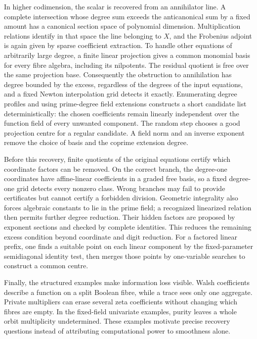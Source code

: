 In higher codimension, the scalar is recovered from an annihilator line.
A complete intersection whose degree sum exceeds the anticanonical sum by
a fixed amount has a canonical section space of polynomial dimension.
Multiplication relations identify in that space the line belonging to $X$,
and the Frobenius adjoint is again given by sparse coefficient extraction.
To handle other equations of arbitrarily large degree, a finite linear
projection gives a common monomial basis for every fibre algebra, including
its nilpotents. The residual quotient is free over the same projection
base. Consequently the obstruction to annihilation has degree bounded by
the excess, regardless of the degrees of the input equations, and a fixed
Newton interpolation grid detects it exactly. Enumerating degree
profiles and using prime-degree field extensions constructs a short
candidate list deterministically: the chosen coefficients remain linearly
independent over the function field of every unwanted component. The
random step chooses a good projection centre for a regular candidate.
A field norm and an inverse exponent remove the choice of basis and the
coprime extension degree.

Before this recovery, finite quotients of the original equations certify which coordinate factors can be removed. On the correct branch, the degree-one coordinates have affine-linear coefficients in a graded free basis, so a fixed degree-one grid detects every nonzero class. Wrong branches may fail to provide certificates but cannot certify a forbidden division. Geometric integrality also forces algebraic constants to lie in the prime field; a recognized linearized relation then permits further degree reduction. Their hidden factors are proposed by exponent sections and checked by complete identities. This reduces the remaining excess condition beyond coordinate and digit reduction. For a factored linear prefix, one finds a suitable point on each linear component by the fixed-parameter semidiagonal identity test, then merges those points by one-variable searches to construct a common centre.

Finally, the structured examples make information loss visible. Walsh coefficients describe a function on a split Boolean fibre, while a trace sees only one aggregate. Private multipliers can erase several zeta coefficients without changing which fibres are empty. In the fixed-field univariate examples, purity leaves a whole orbit multiplicity undetermined. These examples motivate precise recovery questions instead of attributing computational power to smoothness alone.
